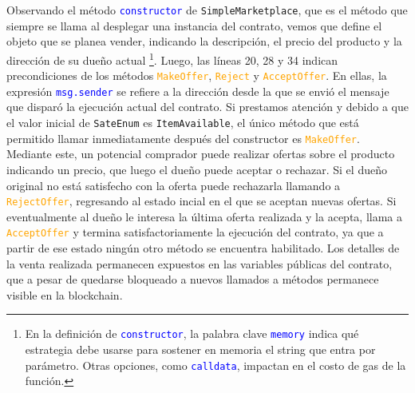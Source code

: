 Observando el método \textcolor{blue}{\texttt{constructor}} de \texttt{SimpleMarketplace}, que es el método que siempre se llama al desplegar una instancia del contrato, vemos que define el objeto que se planea vender, indicando la descripción, el precio del producto y la dirección de su dueño actual \footnote{En la definición de \textcolor{blue}{\texttt{constructor}}, la palabra clave \textcolor{blue}{\texttt{memory}} indica qué estrategia debe usarse para sostener en memoria el string que entra por parámetro. Otras opciones, como \textcolor{blue}{\texttt{calldata}}, impactan en el costo de gas de la función.}.
Luego, las líneas 20, 28 y 34 indican precondiciones de los métodos \textcolor{orange}{\texttt{MakeOffer}}, \textcolor{orange}{\texttt{Reject}} y \textcolor{orange}{\texttt{AcceptOffer}}.
En ellas, la expresión \textcolor{blue}{\texttt{msg.sender}} se refiere a la dirección desde la que se envió el mensaje que disparó la ejecución actual del contrato.
Si prestamos atención y debido a que el valor inicial de \texttt{SateEnum} es \texttt{ItemAvailable}, el único método que está permitido llamar inmediatamente después del constructor es \textcolor{orange}{\texttt{MakeOffer}}.
Mediante este, un potencial comprador puede realizar ofertas sobre el producto indicando un precio, que luego el dueño puede aceptar o rechazar.
Si el dueño original no está satisfecho con la oferta puede rechazarla llamando a \textcolor{orange}{\texttt{RejectOffer}}, regresando al estado incial en el que se aceptan nuevas ofertas.
Si eventualmente al dueño le interesa la última oferta realizada y la acepta, llama a \textcolor{orange}{\texttt{AcceptOffer}} y termina satisfactoriamente la ejecución del contrato, ya que
a partir de ese estado ningún otro método se encuentra habilitado. Los detalles de la venta realizada permanecen expuestos en las variables públicas del contrato, que a pesar de quedarse bloqueado a nuevos llamados a métodos permanece visible en la blockchain.



